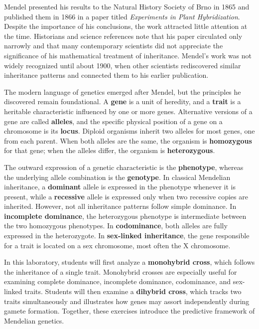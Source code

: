 \documentclass[
  letterpaper,
  DIV=11,
  numbers=noendperiod]{scrreprt}
\begin{document}
Mendel presented his results to the Natural History Society of Brno in
1865 and published them in 1866 in a paper titled \emph{Experiments in
Plant Hybridization}. Despite the importance of his conclusions, the
work attracted little attention at the time. Historians and science
references note that his paper circulated only narrowly and that many
contemporary scientists did not appreciate the significance of his
mathematical treatment of inheritance. Mendel's work was not widely
recognized until about 1900, when other scientists rediscovered similar
inheritance patterns and connected them to his earlier publication.

The modern language of genetics emerged after Mendel, but the principles
he discovered remain foundational. A \textbf{gene} is a unit of
heredity, and a \textbf{trait} is a heritable characteristic influenced
by one or more genes. Alternative versions of a gene are called
\textbf{alleles}, and the specific physical position of a gene on a
chromosome is its \textbf{locus}. Diploid organisms inherit two alleles
for most genes, one from each parent. When both alleles are the same,
the organism is \textbf{homozygous} for that gene; when the alleles
differ, the organism is \textbf{heterozygous}.

The outward expression of a genetic characteristic is the
\textbf{phenotype}, whereas the underlying allele combination is the
\textbf{genotype}. In classical Mendelian inheritance, a
\textbf{dominant} allele is expressed in the phenotype whenever it is
present, while a \textbf{recessive} allele is expressed only when two
recessive copies are inherited. However, not all inheritance patterns
follow simple dominance. In \textbf{incomplete dominance}, the
heterozygous phenotype is intermediate between the two homozygous
phenotypes. In \textbf{codominance}, both alleles are fully expressed in
the heterozygote. In \textbf{sex-linked inheritance}, the gene
responsible for a trait is located on a sex chromosome, most often the X
chromosome.

In this laboratory, students will first analyze a \textbf{monohybrid
cross}, which follows the inheritance of a single trait. Monohybrid
crosses are especially useful for examining complete dominance,
incomplete dominance, codominance, and sex-linked traits. Students will
then examine a \textbf{dihybrid cross}, which tracks two traits
simultaneously and illustrates how genes may assort independently during
gamete formation. Together, these exercises introduce the predictive
framework of Mendelian genetics.
\end{document}
